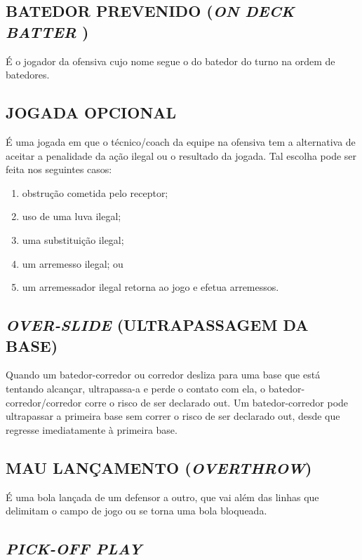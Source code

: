 \subsection{BATEDOR PREVENIDO (\textit{ON DECK BATTER} )}
É o jogador da ofensiva cujo nome segue o do batedor do turno na ordem de
batedores.

\subsection{JOGADA OPCIONAL}
É uma jogada em que o técnico/\gls{coach} da equipe na ofensiva tem a alternativa de aceitar a penalidade da ação ilegal ou o resultado da jogada. Tal escolha pode  ser feita nos seguintes casos:

\begin{enumerate}[label= \roman*.]
	\item obstrução cometida pelo receptor;
	\item uso de uma luva ilegal;
	\item uma substituição ilegal;
	\item um arremesso ilegal; ou
	\item um arremessador ilegal retorna ao jogo e efetua arremessos.
\end{enumerate}

\subsection{\textit{OVER-SLIDE} (ULTRAPASSAGEM DA BASE)}

Quando um batedor-corredor ou corredor desliza para uma base que está tentando alcançar, ultrapassa-a e perde o contato com ela, o batedor-corredor/corredor corre o risco de ser declarado \gls{out}. Um batedor-corredor pode ultrapassar a primeira base sem correr o risco de ser declarado \gls{out}, desde que regresse imediatamente à primeira base.

\subsection{MAU LANÇAMENTO (\textit{OVERTHROW})}

É uma bola lançada de um defensor a outro, que vai além das linhas que  delimitam o campo de jogo ou se torna uma bola bloqueada.

\subsection{\textit{PICK-OFF PLAY}}

